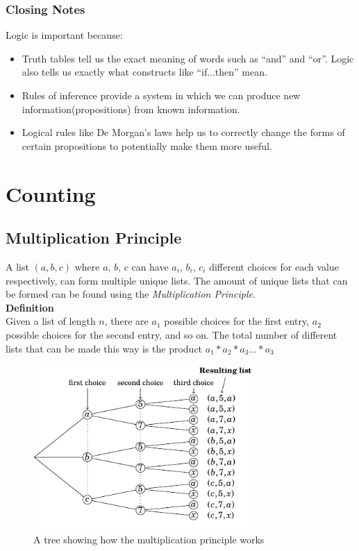 \documentclass[a4paper,11pt]{article}
\begin{document}
\subsubsection{Closing Notes}
Logic is important because:
\begin{itemize}
 \item Truth tables tell us the exact meaning of words such as ``and'' and ``or''. Logic also tells us exactly what constructs like ``if...then'' mean.
 \item Rules of inference provide a system in which we can produce new information(propositions) from known information.
 \item Logical rules like De Morgan's laws help us to correctly change the forms of certain propositions to potentially make them more useful.
\end{itemize}
\section{Counting}
\subsection{Multiplication Principle}
A list $(a, b, c)$ where $a$, $b$, $c$ can have $a_i$, $b_i$, $c_i$ different choices for each value respectively, can form multiple unique lists. The amount of unique lists that can be formed can be found using the \textit{Multiplication Principle}.\vspace{5pt}\\
\textbf{Definition}\\
Given a list of length $n$, there are $a_1$ possible choices for the first entry, $a_2$ possible choices for the second entry, and so on. The total number of different lists that can be made this way is the product $a_{1}*a_{2}*a_{3} \dots *a_{3}$
\begin{figure}[h]
 \centering
 \includegraphics[width=0.75\textwidth]{multiprinc.png}
 \caption{A tree showing how the multiplication principle works}
\end{figure}
\end{document}
